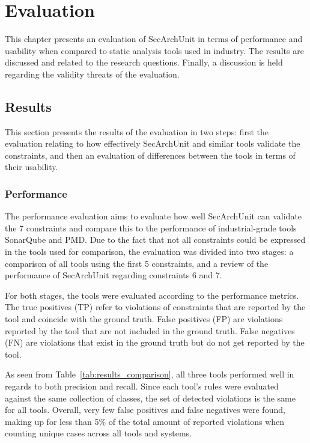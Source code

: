 \chapter{Evaluation}

This chapter presents an evaluation of SecArchUnit in terms of performance and usability when compared to static analysis tools used in industry. The results are discussed and related to the research questions. Finally, a discussion is held regarding the validity threats of the evaluation.

\section{Results}
This section presents the results of the evaluation in two steps: first the evaluation relating to how effectively SecArchUnit and similar tools validate the constraints, and then an evaluation of differences between the tools in terms of their usability.

\subsection{Performance}\label{sec:performance_results}
The performance evaluation aims to evaluate how well SecArchUnit can validate the 7 constraints and compare this to the performance of industrial-grade tools SonarQube and PMD. Due to the fact that not all constraints could be expressed in the tools used for comparison, the evaluation was divided into two stages: a comparison of all tools using the first 5 constraints, and a review of the performance of SecArchUnit regarding constraints 6 and 7.

For both stages, the tools were evaluated according to the performance metrics. The true positives (TP) refer to violations of constraints that are reported by the tool and coincide with the ground truth. False positives (FP) are violations reported by the tool that are not included in the ground truth. False negatives (FN) are violations that exist in the ground truth but do not get reported by the tool. 



As seen from Table~\ref{tab:results_comparison}, all three tools performed well in regards to both precision and recall. Since each tool's rules were evaluated against the same collection of classes, the set of detected violations is the same for all tools. Overall, very few false positives and false negatives were found, making up for less than 5\% of the total amount of reported violations when counting unique cases across all tools and systems. 

